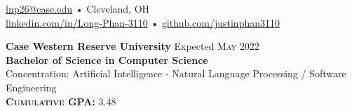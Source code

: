 \documentclass[a4paper,11pt]{article}
\begin{document}
 
 
\begin{center} 
\href{mailto:lnp26@case.edu}{lnp26@case.edu} • Cleveland, OH \\
\href{https://linkedin.com/in/Long-Phan-3110/}{linkedin.com/in/Long-Phan-3110} • \href{http://github.com/justinphan3110}{github.com/justinphan3110}
\noindent\makebox[\linewidth]{\rule{\paperwidth}{2pt}}
\end{center}

\begin{flushleft}
	\textbf{Case Western Reserve University } \hspace{1cm} Expected \textsc{May} 2022 \\
	\textbf{Bachelor of Science in Computer Science} \\
	Concentration: Artificial Intelligence - Natural Language Processing / Software Engineering \\
	\textbf{\textsc{Cumulative GPA:}} 3.48 \\
    		
	\centering{\noindent\makebox{\rule{8cm}{1.5pt}}}
\end{flushleft}

\end{document}
